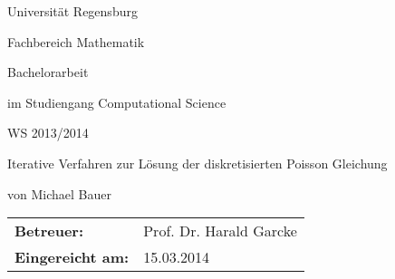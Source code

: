 
\usepackage{geometry}
\geometry{tmargin=3cm,bmargin=3cm,lmargin=5cm,rmargin=2cm}


\pagestyle{empty}

\clearscrheadings\clearscrplain

\begin{center}
\begin{Huge}
Universität Regensburg\\
\vspace{3mm}
\end{Huge}{\Large Fachbereich Mathematik}


\vspace{}
\begin{Large}
Bachelorarbeit
\end{Large}

\vspace{5mm}
\begin{large}
im Studiengang Computational Science  
\end{large}

\vspace{5mm}
\begin{large}
WS 2013/2014
\end{large}

\vspace{10mm}
\begin{Large}
Iterative Verfahren zur Lösung der diskretisierten Poisson Gleichung
\end{Large}

\vspace{5mm}
\begin{large}
von Michael Bauer
\end{large}

\vspace{3cm}
\begin{tabular}{ll}
{\bf Betreuer:} &Prof. Dr. Harald Garcke\\
{\bf Eingereicht am:} &15.03.2014\\
\end{tabular}

\end{center}
\clearpage


\pagestyle{useheadings} %


